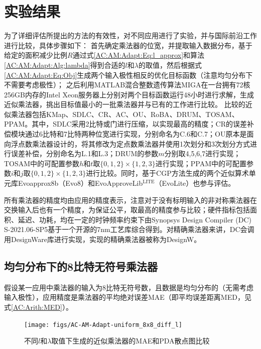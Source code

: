 \section{实验结果} \label{ASIC实验结果}

为了详细评估所提出的方法的有效性，对不同应用进行了实验，并与国际前沿工作进行比较，具体步骤如下：
首先确定乘法器的位宽，并提取输入数据分布，基于给定的面积减少比例$R$通过式\eqref{AC:AM:Adapt:Eq:l_approx}和算法\ref{AC:AM:Adapt:Alg:lambda}得到合适的$l$和$\lambda$的取值，然后根据式\eqref{AC:AM:Adapt:Eq:Obj}生成两个输入极性相反的优化目标函数（注意均匀分布下不需要考虑极性）；
之后利用MATLAB混合整数遗传算法MIGA在一台拥有72核256GB内存的Intel Xeon服务器上分别对两个目标函数运行48小时进行求解，生成近似乘法器，挑出目标值最小的一批乘法器并与已有的工作进行比较。
比较的近似乘法器包括KMap\cite{AC:AM:KMap}、SDLC\cite{AC:AM:SDLC}、CR\cite{AC:AM:CR}、AC\cite{AC:AM:AC}、OU\cite{AC:AM:OU}、RoBA\cite{AC:AM:RoBA}、DRUM\cite{AC:AM:DRUM}、TOSAM\cite{AC:AM:TOSAM}、PPAM\cite{AC:AM:PPAM}。其中，SDLC采用2比特或门进行压缩，以实现最高的精度；CR的误差补偿模块通过6比特和7比特两种位宽进行实现，分别命名为C.6和C.7；OU原本是面向浮点数乘法器设计的，将其修改为定点数乘法器并使用1次划分和3次划分方式进行误差补偿，分别命名为L.1和L.3；DRUM的参数$m$分别取4,5,6,7进行实现；TOSAM中的可配置参数$h$和$t$取$\{0, 1, 2\} \times \{1, 2, 3\}$进行实现；PPAM中的可配置参数$i$和$j$取$\{0, 1, 2\} \times \{1, 2, 3\}$进行比较。同时，基于CGP方法生成的两个近似算术单元库Evoapprox8b（Evo8）\cite{AC:AM:CGP_Evoapprox8b}和EvoApproveLib$^\text{LITE}$（EvoLite）\cite{AC:AM:CGP_EvoLite}也参与评估。

所有乘法器的精度均由应用的精度表示，注意对于没有标明输入的非对称乘法器在交换输入后也有一个精度，为保证公平，取最高的精度参与比较；硬件指标包括面积、延迟、功耗，均在一定的时钟频率约束下由Synopsys Design Compiler (DC) S-2021.06-SP5基于一个开源的7nm工艺库\cite{ASAP7_github}综合得到。对精确乘法器来讲，DC会调用DesignWare库\cite{IP:DesignWare}进行实现，实现的精确乘法器被称为DesignW。


\subsection{均匀分布下的8比特无符号乘法器}

假设某一应用中乘法器的输入为8比特无符号数，且数据是均匀分布的（无需考虑输入极性），应用精度是乘法器的平均绝对误差MAE（即平均误差距离MED，见式\eqref{AC:Arith:MED}）。

\begin{figure}[!h]
    \centering
    \texttt{[image: figs/AC-AM-Adapt-uniform\_8x8\_diff\_l]}
    \caption{不同$l$和$\lambda$取值下生成的近似乘法器的MAE和PDA散点图比较}
    \label{AC:AM:Adapt:Fig:uniform_8x8_diff_l}
\end{figure}

